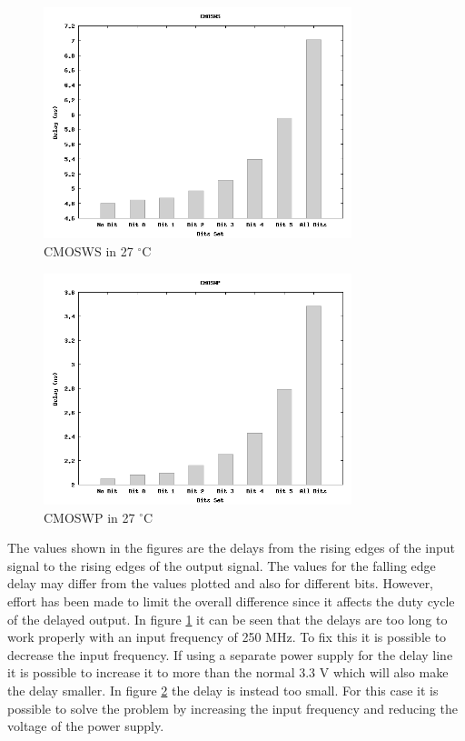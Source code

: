 \documentclass[a4paper,12pt]{article} \usepackage{graphicx}
\newcommand{\degree}{\ensuremath{^\circ}}
\begin{document}
\begin{figure}[h!]
        \centering
        \includegraphics[width=0.8\textwidth]{../Bilder/Delay_Line/CMOSWS.png}
        \caption{CMOSWS in 27 \degree C}
        \label{fig:CMOSWS}
\end{figure}\begin{figure}[h!]
        \centering
        \includegraphics[width=0.8\textwidth]{../Bilder/Delay_Line/CMOSWP.png}
        \caption{CMOSWP in 27 \degree C}
        \label{fig:CMOSWP}
\end{figure}

The values shown in the figures are the
delays from the rising edges of the input signal to the rising edges of the
output signal. The values for the falling edge delay may differ from the values
plotted and also for different bits. However, effort has been made to limit the
overall difference since it affects the duty cycle of the delayed output. 
In figure \ref{fig:CMOSWS} it can be seen that the delays are too long to work
properly with an input frequency of 250 MHz. To fix this it is possible to
decrease the input frequency. If using a separate power supply for the delay
line it is possible to increase it to more than the normal 3.3 V which will
also make the delay smaller. In figure \ref{fig:CMOSWP} the delay is instead too
small. For this case it is possible to solve the problem by increasing the input
frequency and reducing the voltage of the power supply.
\end{document}
